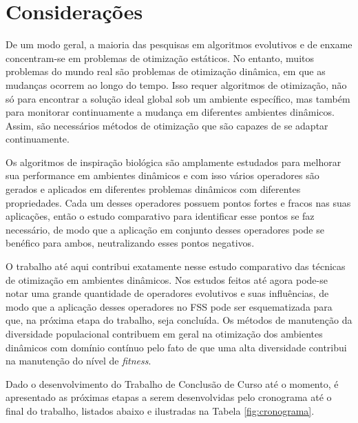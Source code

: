 \chapter{Considerações}
\label{ch:consideracoes}

De um modo geral, a maioria das pesquisas em algoritmos evolutivos e de enxame concentram-se em problemas de otimização estáticos. No entanto, muitos problemas do mundo real são problemas de otimização dinâmica, em que as mudanças ocorrem ao longo do tempo. Isso requer algoritmos de otimização, não só para encontrar a solução ideal global sob um ambiente específico, mas também para monitorar continuamente a mudança em diferentes ambientes dinâmicos. Assim, são necessários métodos de otimização que são capazes de se adaptar continuamente.

Os algoritmos de inspiração biológica são amplamente estudados para melhorar sua performance em ambientes dinâmicos e com isso vários operadores são gerados e aplicados em diferentes problemas dinâmicos com diferentes propriedades. Cada um desses operadores possuem pontos fortes e fracos nas suas aplicações, então o estudo comparativo para identificar esse pontos se faz necessário, de modo que a aplicação em conjunto desses operadores pode se benéfico para ambos, neutralizando esses pontos negativos.

O trabalho até aqui contribui exatamente nesse estudo comparativo das técnicas de otimização em ambientes dinâmicos. Nos estudos feitos até agora pode-se notar uma grande quantidade de operadores evolutivos e suas influências, de modo que a aplicação desses operadores no FSS pode ser esquematizada para que, na próxima etapa do trabalho, seja concluída. Os métodos de manutenção da diversidade populacional contribuem em geral na otimização dos ambientes dinâmicos com domínio contínuo pelo fato de que uma alta diversidade contribui na manutenção do nível de \textit{fitness}.

Dado o desenvolvimento do Trabalho de Conclusão de Curso até o momento, é apresentado as próximas etapas a serem desenvolvidas pelo cronograma até o final do trabalho, listados abaixo e ilustradas na Tabela \ref{fig:cronograma}.

